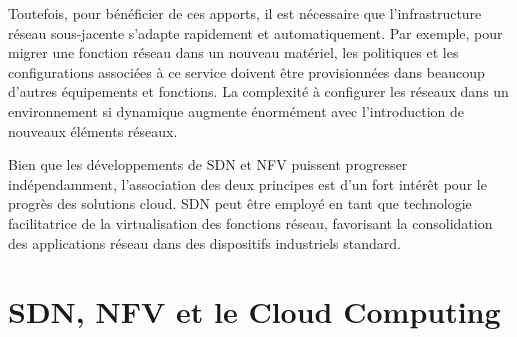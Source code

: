 Toutefois, pour bénéficier de ces apports, il est nécessaire que l'infrastructure réseau sous-jacente s'adapte rapidement et automatiquement. Par exemple, pour migrer une fonction réseau  dans un nouveau matériel, les politiques et les configurations associées à ce service doivent être provisionnées dans beaucoup d'autres équipements et fonctions. La complexité à configurer les réseaux dans un environnement si dynamique augmente énormément avec l'introduction de nouveaux éléments réseaux.


Bien que les développements de SDN et NFV puissent progresser indépendamment, l'association des deux principes est d'un fort intérêt pour le progrès des solutions cloud. SDN peut être employé en tant que technologie facilitatrice de la virtualisation des fonctions réseau, favorisant la consolidation des applications réseau dans des dispositifs industriels standard. \cite{OFSDNNFVintro} \cite{realTimeCloudNFV} \cite{IntelCloudEPC}





\section{SDN, NFV et le Cloud Computing}

